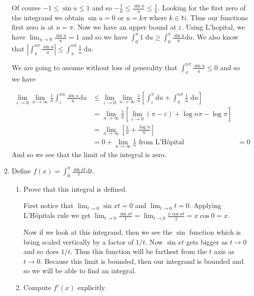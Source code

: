 \documentclass[letterpaper]{article}
\begin{document}
\begin{enumerate}
Of course $-1\le \sin u\le 1$ and so $-\frac{1}{u}\le \frac{\sin u}{u}\le \frac{1}{u}$. Looking for the first zero of the integrand we obtain $\sin u=0$ or $u=k\pi$ where $k\in \mathbb{N}$. Thus our functions first zero is at $u=\pi$. Now we have an upper bound at $\varepsilon$. Using L'hopital, we have $\lim_{u\to0}\frac{\sin u}{u}=1$ and so we have $\int_0^\pi{1\;\mathrm{d}u}\ge \int_0^\pi{\frac{\sin u}{u}\mathrm{d}u}$. We also know that $\displaystyle \left\lvert\int_\pi^{n\pi}{\frac{\sin u}{u}}\right\rvert\le \int_\pi^{n\pi}{\frac{1}{u}\;\mathrm{d}u}$.

We are going to assume without loss of generality that $\int_\pi^{n\pi}{\frac{\sin u}{u}}\le 0$ and so we have

\begin{align*}
  \lim_{\varepsilon\to0}\lim_{n\to\infty}\frac{1}{n}\int_\varepsilon^{\pi n}{\frac{\sin u}{u}\mathrm{d}u}
  &\le \lim_{\varepsilon\to0}\lim_{n\to\infty}\frac{1}{n}\left[\int_\varepsilon^\pi{\mathrm{d}u}+\int_\pi^{n\pi}{\frac{1}{u}\;\mathrm{d}u}\right]\\
  &= \lim_{n\to\infty}\frac{1}{n}\left[\lim_{\varepsilon\to0}\left(\pi-\varepsilon\right)+\log n\pi-\log\pi\right]\\
  &= \lim_{n\to\infty}\left[\frac{\pi}{n}+\frac{\log n}{n}\right]\\
  &= 0+\lim_{n\to\infty}\frac{1}{n} \text{ from L'Hôpital}
  &=0
\end{align*}
And so we see that the limit of the integral is zero.
\item
Define $\displaystyle f(x)=\int_0^\pi{\frac{\sin xt}{t}\mathrm{d}t}$.
  \begin{enumerate}
  \item
  Prove that this integral is defined.

  First notice that $\displaystyle \lim_{t\to 0}\sin xt=0$ and $\displaystyle \lim_{t\to0}t=0$.
  Applying L'Hôpitals rule we get $\displaystyle \lim_{t\to0}\frac{\sin xt}{t}=\lim_{t\to 0}\frac{x\cos xt}{1}=x\cos 0=x$.

  Now if we look at this integrand, then we see the $\sin$ function which is being scaled vertically by a factor of $1/t$. Now $\sin xt$ gets bigger as $t\to 0$ and so does $1/t$. Thus this function will be farthest from the $t$ axis as $t\to 0$. Because this limit is bounded, then our integrand is bounded and so we will be able to find an integral.
  \item
  Compute $f'(x)$ explicitly.


\end{enumerate}
\end{enumerate}
\end{document}
